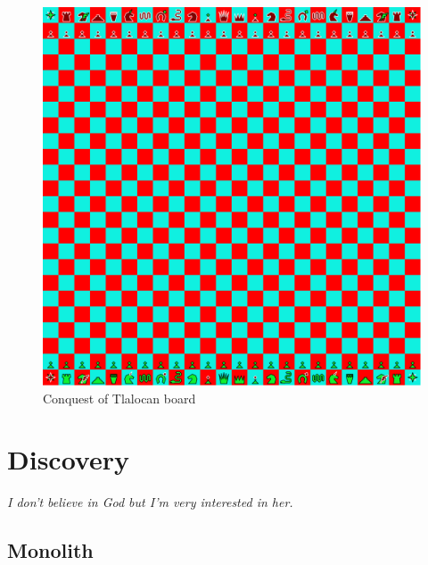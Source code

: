 \documentclass[a5paper,12pt,draft]{book} %
\begin{document}
\noindent
\begin{figure}[h]
\includegraphics[width=1.0\textwidth, keepaspectratio=true]{../gfx/boards/18_conquest_of_tlalocan.png}
\caption{Conquest of Tlalocan board}
\label{fig:conquest_of_tlalocan}
\end{figure}

\clearpage

\chapter*{Discovery}

\begin{flushright}
\parbox{0.8\textwidth}{
\emph{I don’t believe in God but I’m very interested in her. \\
 } }
\end{flushright}

\section*{Monolith}
\end{document}
